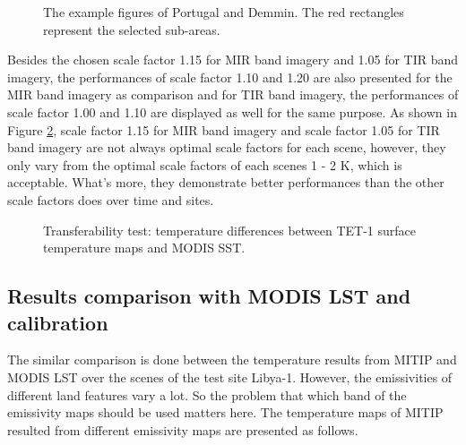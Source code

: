 \begin{figure}[!htbp]
\centering
{}
\vspace{0.5in}
\caption{The example figures of Portugal and Demmin. The red rectangles represent the selected sub-areas.}
\label{fig:portugal&demmin}
\end{figure}

\noindent Besides the chosen scale factor 1.15 for MIR band imagery and 1.05 for TIR band imagery, the performances of scale factor 1.10 and 1.20 are also presented for the MIR band imagery as comparison and for TIR band imagery, the performances of scale factor 1.00 and 1.10 are displayed as well for the same purpose. As shown in Figure \ref{fig:SST_test}, scale factor 1.15 for MIR band imagery and scale factor 1.05 for TIR band imagery are not always optimal scale factors for each scene, however, they only vary from the optimal scale factors of each scenes 1 - 2 K, which is acceptable. What's more, they demonstrate better performances than the other scale factors does over time and sites.\\

\begin{figure}[!htbp]
\centering
{}
\hspace{0.5in}
\caption{Transferability test: temperature differences between TET-1 surface temperature maps and MODIS SST.}
\label{fig:SST_test}
\end{figure}


\subsection{Results comparison with MODIS LST and calibration}
The similar comparison is done between the temperature results from MITIP and MODIS LST over the scenes of the test site Libya-1. However, the emissivities of different land features vary a lot. So the problem that which band of the emissivity maps should be used matters here. The temperature maps of MITIP resulted from different emissivity maps are presented as follows.\\


